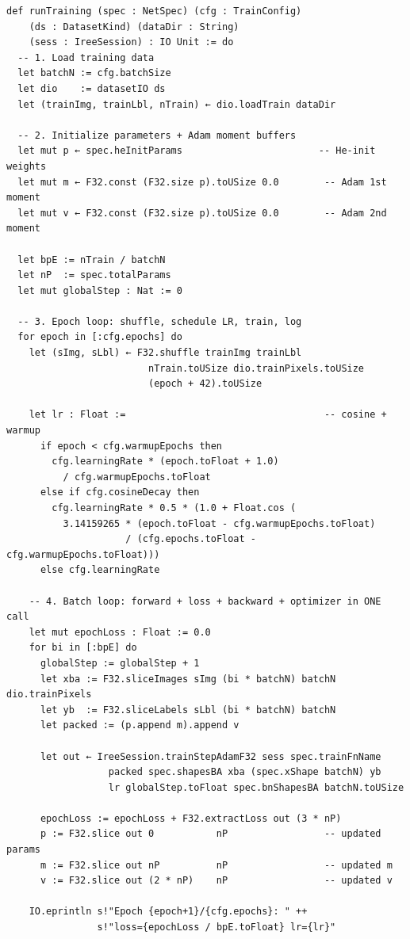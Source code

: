 \begin{verbatim}
def runTraining (spec : NetSpec) (cfg : TrainConfig)
    (ds : DatasetKind) (dataDir : String)
    (sess : IreeSession) : IO Unit := do
  -- 1. Load training data
  let batchN := cfg.batchSize
  let dio    := datasetIO ds
  let (trainImg, trainLbl, nTrain) ← dio.loadTrain dataDir

  -- 2. Initialize parameters + Adam moment buffers
  let mut p ← spec.heInitParams                        -- He-init weights
  let mut m ← F32.const (F32.size p).toUSize 0.0        -- Adam 1st moment
  let mut v ← F32.const (F32.size p).toUSize 0.0        -- Adam 2nd moment

  let bpE := nTrain / batchN
  let nP  := spec.totalParams
  let mut globalStep : Nat := 0

  -- 3. Epoch loop: shuffle, schedule LR, train, log
  for epoch in [:cfg.epochs] do
    let (sImg, sLbl) ← F32.shuffle trainImg trainLbl
                         nTrain.toUSize dio.trainPixels.toUSize
                         (epoch + 42).toUSize

    let lr : Float :=                                   -- cosine + warmup
      if epoch < cfg.warmupEpochs then
        cfg.learningRate * (epoch.toFloat + 1.0)
          / cfg.warmupEpochs.toFloat
      else if cfg.cosineDecay then
        cfg.learningRate * 0.5 * (1.0 + Float.cos (
          3.14159265 * (epoch.toFloat - cfg.warmupEpochs.toFloat)
                     / (cfg.epochs.toFloat - cfg.warmupEpochs.toFloat)))
      else cfg.learningRate

    -- 4. Batch loop: forward + loss + backward + optimizer in ONE call
    let mut epochLoss : Float := 0.0
    for bi in [:bpE] do
      globalStep := globalStep + 1
      let xba := F32.sliceImages sImg (bi * batchN) batchN dio.trainPixels
      let yb  := F32.sliceLabels sLbl (bi * batchN) batchN
      let packed := (p.append m).append v

      let out ← IreeSession.trainStepAdamF32 sess spec.trainFnName
                  packed spec.shapesBA xba (spec.xShape batchN) yb
                  lr globalStep.toFloat spec.bnShapesBA batchN.toUSize

      epochLoss := epochLoss + F32.extractLoss out (3 * nP)
      p := F32.slice out 0           nP                 -- updated params
      m := F32.slice out nP          nP                 -- updated m
      v := F32.slice out (2 * nP)    nP                 -- updated v

    IO.eprintln s!"Epoch {epoch+1}/{cfg.epochs}: " ++
                s!"loss={epochLoss / bpE.toFloat} lr={lr}"


\end{verbatim}
